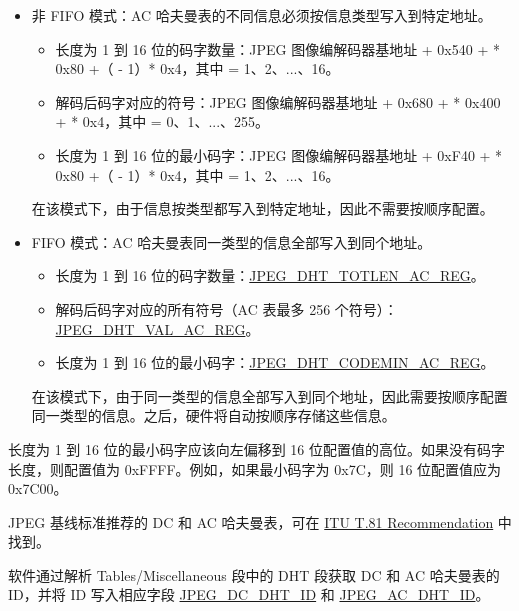 \documentclass[main\_\_CN.tex]{subfiles}
\begin{document}
\begin{itemize}
    \item  非 FIFO 模式：AC 哈夫曼表的不同信息必须按信息类型写入到特定地址。
    \begin{itemize}
        \item 长度为 1 到 16 位的码字数量：JPEG 图像编解码器基地址 + 0x540 +  * 0x80 +（ - 1）* 0x4，其中  = 1、2、...、16。
        \item 解码后码字对应的符号：JPEG 图像编解码器基地址 + 0x680 +  * 0x400 +  * 0x4，其中  = 0、1、...、255。
        \item 长度为 1 到 16 位的最小码字：JPEG 图像编解码器基地址 + 0xF40 +  * 0x80 +（ - 1）* 0x4，其中  = 1、2、...、16。
    \end{itemize}
    在该模式下，由于信息按类型都写入到特定地址，因此不需要按顺序配置。
    \item FIFO 模式：AC 哈夫曼表同一类型的信息全部写入到同个地址。
    \begin{itemize}
        \item 长度为 1 到 16 位的码字数量：\hyperref[regdesc:JPEGDHTTOTLENAC0REG]{JPEG\_DHT\_TOTLEN\_AC\_REG}。
        \item 解码后码字对应的所有符号（AC 表最多 256 个符号）：\hyperref[regdesc:JPEGDHTVALAC0REG]{JPEG\_DHT\_VAL\_AC\_REG}。
        \item 长度为 1 到 16 位的最小码字：\hyperref[regdesc:JPEGDHTCODEMINAC0REG]{JPEG\_DHT\_CODEMIN\_AC\_REG}。
    \end{itemize}
    在该模式下，由于同一类型的信息全部写入到同个地址，因此需要按顺序配置同一类型的信息。之后，硬件将自动按顺序存储这些信息。
\end{itemize}

长度为 1 到 16 位的最小码字应该向左偏移到 16 位配置值的高位。如果没有码字长度，则配置值为 0xFFFF。例如，如果最小码字为 0x7C，则 16 位配置值应为 0x7C00。

JPEG 基线标准推荐的 DC 和 AC 哈夫曼表，可在 \href{https://www.itu.int/rec/T-REC-T.81}{ITU T.81 Recommendation} 中找到。

软件通过解析 Tables/Miscellaneous 段中的 DHT 段获取 DC 和 AC 哈夫曼表的 ID，并将 ID 写入相应字段 \hyperref[regdesc:JPEGDHTINFOREG]{JPEG\_DC\_DHT\_ID} 和 \hyperref[regdesc:JPEGDHTINFOREG]{JPEG\_AC\_DHT\_ID}。
\end{document}
